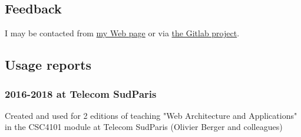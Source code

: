 \documentclass[a4paper]{article}
\begin{document}
\subsection{Feedback}
\label{sec:orgda86094}

I may be contacted from \href{http://www-public.tem-tsp.eu/\~berger\_o/\#sec-3}{my Web page} or via \href{https://gitlab.com/olberger/org-teaching}{the Gitlab project}.

\subsection{Usage reports}
\label{sec:orgad28a85}

\subsubsection{2016-2018 at Telecom SudParis}
\label{sec:org6c6fcc0}

Created and used for 2 editions of teaching "Web Architecture and Applications" in the CSC4101 module at Telecom SudParis (Olivier Berger and colleagues)
\end{document}
